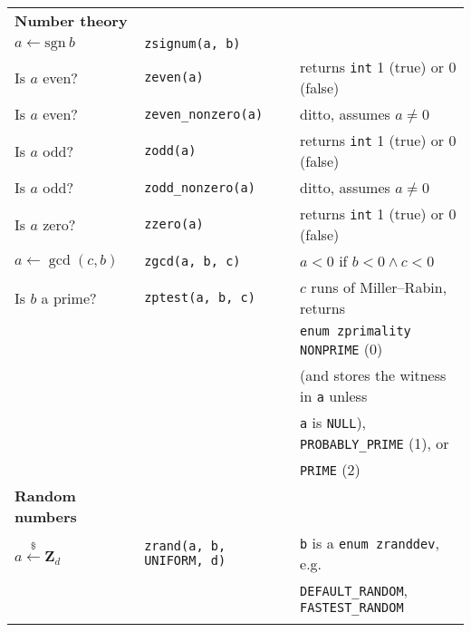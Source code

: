 \documentclass[10pt,draft]{article}
\newcommand{\entry}[3]{ #2 & {\tt #1} & #3 \\ }
\newcommand{\cont}[1]{ & & #1 \\ }
\begin{document}
\begin{tabular}{lll}
\textbf{Number theory} \\
\entry{zsignum(a, b)}     {$a \gets \mbox{sgn}~b$} {}
\entry{zeven(a)}          {Is $a$ even?}           {returns {\tt int} 1 (true) or 0 (false)}
\entry{zeven\_nonzero(a)} {Is $a$ even?}           {ditto, assumes $a \neq 0$}
\entry{zodd(a)}           {Is $a$ odd?}            {returns {\tt int} 1 (true) or 0 (false)}
\entry{zodd\_nonzero(a)}  {Is $a$ odd?}            {ditto, assumes $a \neq 0$}
\entry{zzero(a)}          {Is $a$ zero?}           {returns {\tt int} 1 (true) or 0 (false)}
\entry{zgcd(a, b, c)}     {$a \gets \gcd(c, b)$}   {$a < 0$ if $b < 0 \wedge c < 0$}
\entry{zptest(a, b, c)}   {Is $b$ a prime?}        {$c$ runs of Miller--Rabin, returns}
\cont                                              {{\tt enum zprimality} {\tt NONPRIME} (0)}
\cont                                              {(and stores the witness in {\tt a} unless}
\cont                                              {{\tt a} is {\tt NULL}), {\tt PROBABLY\_PRIME} (1), or}
\cont                                              {{\tt PRIME} (2)}

\textbf{Random numbers} \\
\entry{zrand(a, b, UNIFORM, d)} {$a \xleftarrow{\$} \textbf{Z}_d$}
      {{\tt b} is a {\tt enum zranddev}, e.g.}
\cont {{\tt DEFAULT\_RANDOM}, {\tt FASTEST\_RANDOM}}
\\



\end{tabular}
\end{document}
